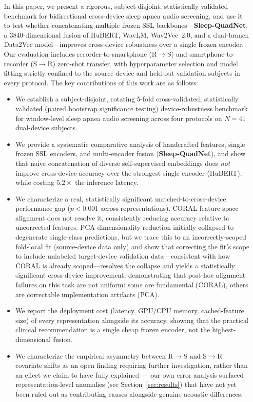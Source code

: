 \documentclass[conference]{IEEEtran}
\begin{document}
In this paper, we present a rigorous, subject-disjoint, statistically validated benchmark for bidirectional cross-device sleep apnea audio screening, and use it to test whether concatenating multiple frozen SSL backbones---\textbf{Sleep-QuadNet}, a 3840-dimensional fusion of HuBERT, WavLM, Wav2Vec~2.0, and a dual-branch Data2Vec model---improves cross-device robustness over a single frozen encoder. Our evaluation includes recorder-to-smartphone (R$\rightarrow$S) and smartphone-to-recorder (S$\rightarrow$R) zero-shot transfer, with hyperparameter selection and model fitting strictly confined to the source device and held-out validation subjects in every protocol. The key contributions of this work are as follows:

\begin{itemize}
  \item We establish a subject-disjoint, rotating 5-fold cross-validated, statistically validated (paired bootstrap significance testing) device-robustness benchmark for window-level sleep apnea audio screening across four protocols on $N=41$ dual-device subjects.

  \item We provide a systematic comparative analysis of handcrafted features, single frozen SSL encoders, and multi-encoder fusion (\textbf{Sleep-QuadNet}), and show that naive concatenation of diverse self-supervised embeddings does \emph{not} improve cross-device accuracy over the strongest single encoder (HuBERT), while costing $5.2\times$ the inference latency.

  \item We characterize a real, statistically significant matched-to-cross-device performance gap ($p<0.001$ across representations). CORAL feature-space alignment does not resolve it, consistently reducing accuracy relative to uncorrected features. PCA dimensionality reduction initially collapsed to degenerate single-class predictions, but we trace this to an incorrectly-scoped fold-local fit (source-device data only) and show that correcting the fit's scope to include unlabeled target-device validation data---consistent with how CORAL is already scoped---resolves the collapse and yields a statistically significant cross-device improvement, demonstrating that post-hoc alignment failures on this task are not uniform: some are fundamental (CORAL), others are correctable implementation artifacts (PCA).

  \item We report the deployment cost (latency, GPU/CPU memory, cached-feature size) of every representation alongside its accuracy, showing that the practical clinical recommendation is a single cheap frozen encoder, not the highest-dimensional fusion.

  \item We characterize the empirical asymmetry between R$\rightarrow$S and S$\rightarrow$R covariate shifts as an open finding requiring further investigation, rather than an effect we claim to have fully explained --- our own error analysis surfaced representation-level anomalies (see Section~\ref{sec:results}) that have not yet been ruled out as contributing causes alongside genuine acoustic differences.
\end{itemize}
\end{document}
